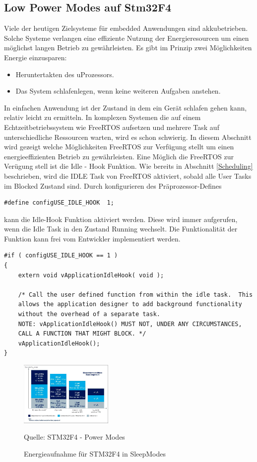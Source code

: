 \documentclass[ngerman]{seminarvorlage}
\newcommand*{\quelle}{%
  \footnotesize Quelle: 
}
\begin{document}
\subsection{Low Power Modes auf Stm32F4}
\label{sec:Low Power Modes}
Viele der heutigen Zielsysteme für embedded Anwendungen sind akkubetrieben. Solche Systeme verlangen eine effiziente Nutzung der Energieresourcen um einen möglichst langen Betrieb zu gewährleisten. Es gibt im Prinzip zwei Möglichkeiten Energie einzusparen:
\begin{itemize}
	\item Heruntertakten des uProzessors.
	\item Das System schlafenlegen, wenn keine weiteren Aufgaben anstehen.
\end{itemize}
In einfachen Anwendung ist der Zustand in dem ein Gerät schlafen gehen kann, relativ leicht zu ermitteln. In komplexen Systemen die auf einem Echtzeitbetriebssystem wie FreeRTOS aufsetzen und mehrere Task auf unterschiedliche Ressourcen warten, wird es schon schwierig. In diesem Abschnitt wird gezeigt welche Möglichkeiten FreeRTOS zur Verfügung stellt um einen energieeffizienten Betrieb zu gewährleisten. Eine Möglich die FreeRTOS zur Verügung stell ist die Idle - Hook Funktion. Wie bereits in Abschnitt \ref{Scheduling} beschrieben, wird die IDLE Task von FreeRTOS aktiviert, sobald alle User Tasks im Blocked Zustand sind. Durch konfigurieren des Präprozessor-Defines        
\begin{lstlisting}[caption={Präprozessor define für Idle Hook. Aus FreeRTOSconfig.h},captionpos=b,label=lst:vPortMallocFree, numbers = none]
#define configUSE_IDLE_HOOK  1; 
\end{lstlisting}
kann die Idle-Hook Funktion aktiviert werden. Diese wird immer aufgerufen, wenn die Idle Task in den Zustand Running wechselt. Die Funktionalität der Funktion kann frei vom Entwickler implementiert werden.  
\begin{lstlisting}[caption={Aufruf der IdleTask Hook Funktion. Aus Task.c},captionpos=b, label=lst:xIdleTaskHook, float=hbt!]
#if ( configUSE_IDLE_HOOK == 1 )
{
	extern void vApplicationIdleHook( void );

	/* Call the user defined function from within the idle task.  This
	allows the application designer to add background functionality
	without the overhead of a separate task.
	NOTE: vApplicationIdleHook() MUST NOT, UNDER ANY CIRCUMSTANCES,
	CALL A FUNCTION THAT MIGHT BLOCK. */
	vApplicationIdleHook();
}     
\end{lstlisting}    
\begin{figure}[hb!]
	\centering
		\includegraphics[width=0.4\textwidth]{Pictures/STM32F4/powerConsumption.png}
	\caption{Energieaufnahme für STM32F4 in SleepModes}
	\quelle{STM32F4 - Power Modes}
	\label{fig:AddressSpaceMMU}
\end{figure} 
\end{document}
